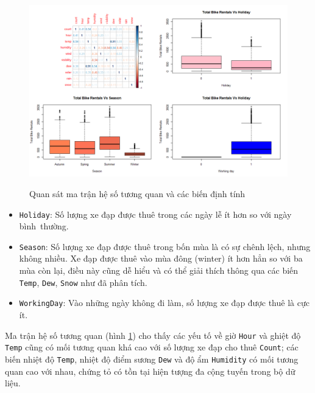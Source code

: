\begin{figure}[H]
	\centering
	{\includegraphics[width=\linewidth]{../Photo Of Result/A2_corr}}	
	\caption{Quan sát ma trận hệ số tương quan và các biến định tính}
	\label{A2_visual2}
\end{figure}

\begin{itemize}
	\item \texttt{Holiday}: Số lượng xe đạp được thuê trong các ngày lễ ít hơn so với ngày bình~thường.
	\item \texttt{Season}: Số lượng xe đạp được thuê trong bốn mùa là có sự chênh lệch, nhưng không nhiều. Xe đạp được thuê vào mùa đông (winter) ít hơn hẳn so với ba mùa còn lại, điều này cũng dễ hiểu và có thể giải thích thông qua các biến \texttt{Temp}, \texttt{Dew}, \texttt{Snow} như đã phân tích.
	\item \texttt{WorkingDay}: Vào những ngày không đi làm, số lượng xe đạp được thuê là cực ít.
\end{itemize}

Ma trận hệ số tương quan (hình \ref{A2_visual2}) cho thấy các yếu tố về giờ \texttt{Hour} và ghiệt độ \texttt{Temp} cũng có mối tương quan khá cao với số lượng xe đạp cho thuê \texttt{Count}; các biến nhiệt độ \texttt{Temp}, nhiệt độ điểm sương \texttt{Dew} và độ ẩm \texttt{Humidity} có mối tương quan cao với nhau, chứng tỏ có tồn tại hiện tượng đa cộng tuyến trong bộ dữ liệu. 

